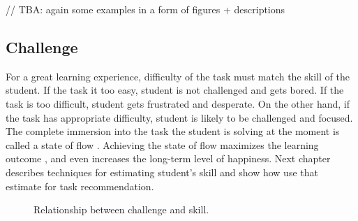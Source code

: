 // TBA: again some examples in a form of figures + descriptions



\subsection{Challenge}
\label{sec:motivation.challenge}
For a great learning experience,
  difficulty of the task must match the skill of the student.
If the task it too easy,
  student is not challenged and gets bored.
If the task is too difficult,
  student gets frustrated and desperate.
On the other hand, if the task has appropriate difficulty,
  student is likely to be challenged and focused.
The complete immersion into the task the student is solving at the moment is called
  a state of flow \cite{flow}.
Achieving the state of flow maximizes the learning outcome \cite{adaptive-practice},
  and even increases the long-term level of happiness. %
Next chapter describes techniques for estimating student’s skill
  and show how use that estimate for task recommendation.

\begin{figure}[h]
  \centering
  \caption{Relationship between challenge and skill.}
\end{figure}
